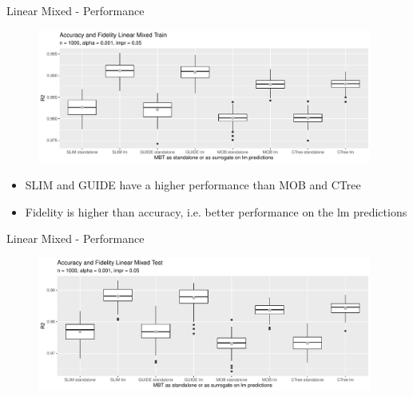 \documentclass[9pt, xcolor=table]{beamer}
\begin{document}
\begin{frame}{Linear Mixed - Performance}

\begin{figure}
    \includegraphics[width=11cm]{Figures/simulations/batchtools/basic_scenarios/linear_mixed/lm_1000_standalone_lm_r2_train.pdf}
\end{figure}  
\begin{itemize}
    \item SLIM and GUIDE have a higher performance than MOB and CTree
    \item Fidelity is higher than accuracy, i.e. better performance on the lm predictions
\end{itemize}
\end{frame}

\begin{frame}{Linear Mixed - Performance}

\begin{figure}
    \includegraphics[width=11cm]{Figures/simulations/batchtools/basic_scenarios/linear_mixed/lm_1000_standalone_lm_r2_test.pdf}
\end{figure}  

\end{frame}
\end{document}
